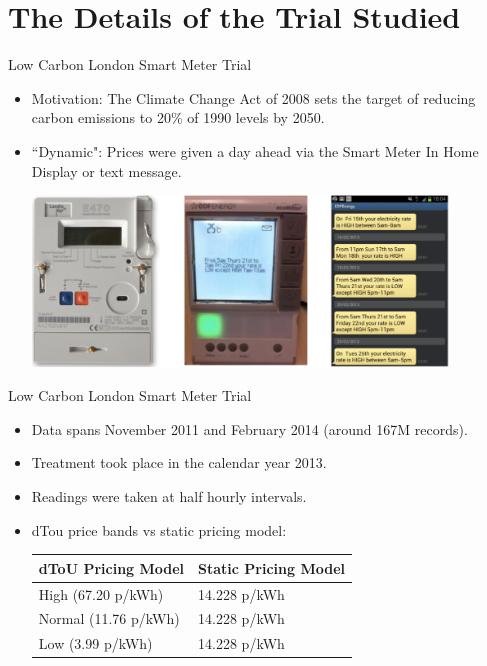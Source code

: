 \documentclass{beamer}
\begin{document}
\section{The Details of the Trial Studied}

\begin{frame}{Low Carbon London Smart Meter Trial}
  \begin{itemize}
    \item<+-> Motivation: The Climate Change Act of 2008 sets the target of reducing carbon emissions to 20\% of 1990 levels by 2050.
    \item<+-> ``Dynamic": Prices were given a day ahead via the Smart Meter In Home Display or text message.
    \vspace{0.3cm}
    \begin{center}
    \includegraphics[width=0.87\textwidth]{images/day-ahead-pricing.png}
    \end{center}
  \end{itemize}
\end{frame}

\begin{frame}{Low Carbon London Smart Meter Trial}
  \begin{itemize}
    \item<+-> Data spans November 2011 and February 2014 (around 167M records).
    \item<+-> Treatment took place in the calendar year 2013.
    \item<+-> Readings were taken at half hourly intervals.
    \item<+-> dTou price bands vs static pricing model:
    \begin{table}[]
      \vspace{0.2cm}
      \centering
      \begin{tabular}{|l|l|}
        \hline
        dToU Pricing Model & Static Pricing Model \\ \hline
        High (67.20 p/kWh) & 14.228 p/kWh \\ \hline
        Normal (11.76 p/kWh) & 14.228 p/kWh \\ \hline
        Low (3.99 p/kWh) & 14.228 p/kWh \\ \hline
      \end{tabular}
    \end{table}
  \end{itemize}
\end{frame}
\end{document}
